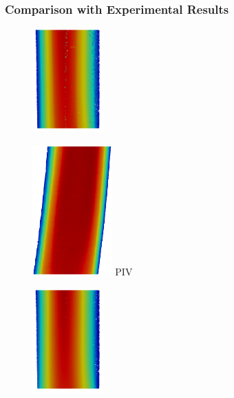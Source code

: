 \subsubsection*{Comparison with Experimental Results}

\begin{figure}
\begin{minipage}[c][9.5cm][c]{0.28\textwidth}
\centering
\vspace*{\fill}
\includegraphics[height=4cm]{imgs/vena_cava/PIV_coronal_rest.png}

\includegraphics[height=5cm]{imgs/vena_cava/PIV_sagittal_rest.png}
PIV
\end{minipage}
\begin{minipage}[c][9.5cm][c]{0.28\textwidth}
\centering
\vspace*{\fill}
\includegraphics[height=4cm]{imgs/vena_cava/FEM_coronal_rest.png}


\end{minipage}
\end{figure}
